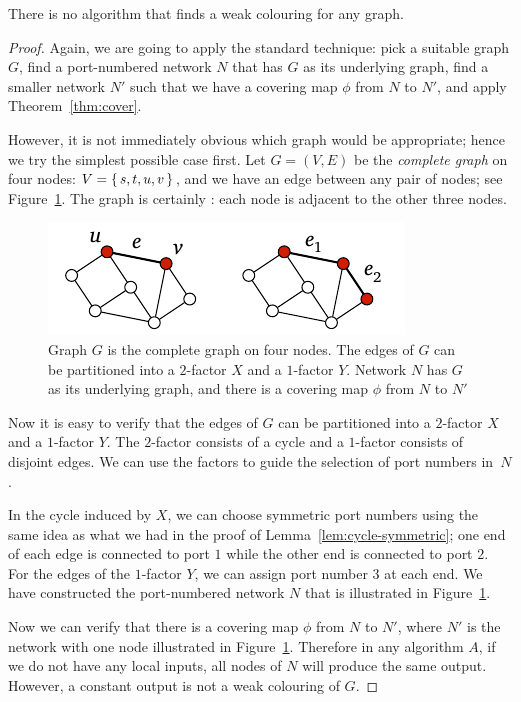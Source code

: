 \begin{lemma}
    There is no algorithm that finds a weak colouring for any  graph.
\end{lemma}
\begin{proof}
    Again, we are going to apply the standard technique: pick a suitable  graph $G$, find a port-numbered network $N$ that has $G$ as its underlying graph, find a smaller network $N'$ such that we have a covering map $\phi$ from $N$ to $N'$, and apply Theorem~\ref{thm:cover}.
    
    However, it is not immediately obvious which  graph would be appropriate; hence we try the simplest possible case first. Let $G = (V,E)$ be the \emph{complete graph} on four nodes: $V = \{\, s,t,u,v \,\}$, and we have an edge between any pair of nodes; see Figure~\ref{fig:three-reg}. The graph is certainly : each node is adjacent to the other three nodes.

    \begin{figure}
        \centering
        \includegraphics[page=\PThreeReg]{figs.pdf}
        \caption{Graph $G$ is the complete graph on four nodes. The edges of $G$ can be partitioned into a $2$-factor $X$ and a $1$-factor $Y$. Network $N$ has $G$ as its underlying graph, and there is a covering map $\phi$ from $N$ to $N'$}\label{fig:three-reg}
    \end{figure}
        
    Now it is easy to verify that the edges of $G$ can be partitioned into a $2$-factor $X$ and a $1$-factor $Y$. The $2$-factor consists of a cycle and a $1$-factor consists of disjoint edges. We can use the factors to guide the selection of port numbers in~$N$.
    
    In the cycle induced by $X$, we can choose symmetric port numbers using the same idea as what we had in the proof of Lemma~\ref{lem:cycle-symmetric}; one end of each edge is connected to port $1$ while the other end is connected to port $2$. For the edges of the $1$-factor $Y$, we can assign port number $3$ at each end. We have constructed the port-numbered network $N$ that is illustrated in Figure~\ref{fig:three-reg}.
    
    Now we can verify that there is a covering map $\phi$ from $N$ to $N'$, where $N'$ is the network with one node illustrated in Figure~\ref{fig:three-reg}. Therefore in any algorithm $A$, if we do not have any local inputs, all nodes of $N$ will produce the same output. However, a constant output is not a weak colouring of $G$.
\end{proof}

